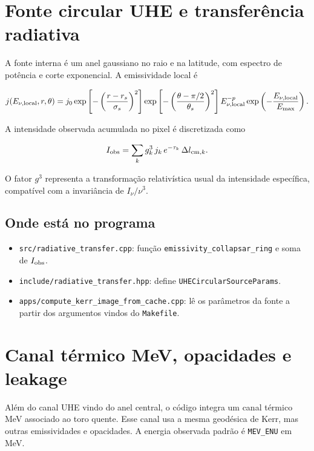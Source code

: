 \documentclass[11pt,a4paper]{article}
\begin{document}
\section{Fonte circular UHE e transferência radiativa}

A fonte interna é um anel gaussiano no raio e na latitude, com espectro de
potência e corte exponencial. A emissividade local é

\begin{equation}
  j(E_{\nu,\rm local},r,\theta) =
  j_0
  \exp\left[-\left(\frac{r-r_s}{\sigma_s}\right)^2\right]
  \exp\left[-\left(\frac{\theta-\pi/2}{\theta_s}\right)^2\right]
  E_{\nu,\rm local}^{-p}
  \exp\left(-\frac{E_{\nu,\rm local}}{E_{\rm max}}\right).
\end{equation}

A intensidade observada acumulada no pixel é discretizada como

\begin{equation}
  I_{\rm obs} =
  \sum_k
  g_k^3\,
  j_k\,
  e^{-\tau_k}\,
  \Delta l_{{\rm cm},k}.
\end{equation}

O fator $g^3$ representa a transformação relativística usual da intensidade
específica, compatível com a invariância de $I_\nu/\nu^3$.

\subsection*{Onde está no programa}

\begin{itemize}
  \item \texttt{src/radiative\_transfer.cpp}: função
  \texttt{emissivity\_collapsar\_ring} e soma de $I_{\rm obs}$.
  \item \texttt{include/radiative\_transfer.hpp}: define
  \texttt{UHECircularSourceParams}.
  \item \texttt{apps/compute\_kerr\_image\_from\_cache.cpp}: lê os
  parâmetros da fonte a partir dos argumentos vindos do \texttt{Makefile}.
\end{itemize}

\section{Canal térmico MeV, opacidades e leakage}

Além do canal UHE vindo do anel central, o código integra um canal térmico
MeV associado ao toro quente. Esse canal usa a mesma geodésica de Kerr, mas
outras emissividades e opacidades. A energia observada padrão é
\texttt{MEV\_ENU} em MeV.
\end{document}
